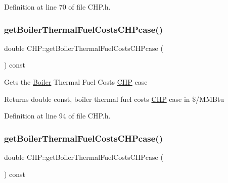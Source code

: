 Definition at line 70 of file C\+H\+P.\+h.

\mbox{\label{class_c_h_p_ace1d96aacf328bd62f01e0eceaae19f6}} 
\subsubsection{\texorpdfstring{get\+Boiler\+Thermal\+Fuel\+Costs\+C\+H\+Pcase()}{getBoilerThermalFuelCostsCHPcase()}\hspace{0.1cm}{\footnotesize\ttfamily [1/3]}}
{\footnotesize\ttfamily double C\+H\+P\+::get\+Boiler\+Thermal\+Fuel\+Costs\+C\+H\+Pcase (\begin{DoxyParamCaption}{ }\end{DoxyParamCaption}) const\hspace{0.3cm}{\ttfamily [inline]}}

Gets the \hyperlink{class_boiler}{Boiler} Thermal Fuel Costs \hyperlink{class_c_h_p}{C\+HP} case

\begin{DoxyReturn}{Returns}
double const, boiler thermal fuel costs \hyperlink{class_c_h_p}{C\+HP} case in \$/\+M\+M\+Btu 
\end{DoxyReturn}


Definition at line 94 of file C\+H\+P.\+h.

\mbox{\label{class_c_h_p_ace1d96aacf328bd62f01e0eceaae19f6}} 
\subsubsection{\texorpdfstring{get\+Boiler\+Thermal\+Fuel\+Costs\+C\+H\+Pcase()}{getBoilerThermalFuelCostsCHPcase()}\hspace{0.1cm}{\footnotesize\ttfamily [2/3]}}
{\footnotesize\ttfamily double C\+H\+P\+::get\+Boiler\+Thermal\+Fuel\+Costs\+C\+H\+Pcase (\begin{DoxyParamCaption}{ }\end{DoxyParamCaption}) const\hspace{0.3cm}{\ttfamily [inline]}}

